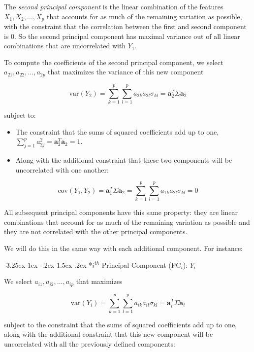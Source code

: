 \documentclass[]{book}
\makeatletter
\renewcommand\subsection{\@startsection{subsection}{2}{\z@}%
                                     {-3.25ex\@plus -1ex \@minus -.2ex}%
                                     {1.5ex \@plus .2ex}%
                                     {\normalfont\large\bfseries\color{Violet}}}
\theoremstyle{definition}
\theoremstyle{definition}
\theoremstyle{definition}
\theoremstyle{remark}
\makeatother
\begin{document}
The \emph{second principal component} is the linear combination of the
features \(X_1,X_2,\ldots,X_p\) that accounts for as much of the
remaining variation as possible, with the constraint that the
correlation between the first and second component is 0. So the second
principal component has maximal variance out of all linear combinations
that are uncorrelated with \(Y_1\).

To compute the coefficients of the second principal component, we select
\(a_{21},a_{22},\ldots,a_{2p}\) that maximizes the variance of this new
component

\[\text{var}(Y_2) = \sum_{k=1}^{p}\sum_{l=1}^{p}a_{2k}a_{2l}\sigma_{kl} = \mathbf{a}^T_2\Sigma\mathbf{a}_2 \]

subject to:

\begin{itemize}
\item
  The constraint that the sums of squared coefficients add up to one,
  \(\sum_{j=1}^{p}a^2_{2j} = \mathbf{a}^T_2\mathbf{a}_2 = 1\).
\item
  Along with the additional constraint that these two components will be
  uncorrelated with one another:
\end{itemize}

\[ \text{cov}(Y_1, Y_2) = \mathbf{a}^T_1\Sigma\mathbf{a}_2  = \sum_{k=1}^{p}\sum_{l=1}^{p}a_{1k}a_{2l}\sigma_{kl} = 0 \]

All subsequent principal components have this same property: they are
linear combinations that account for as much of the remaining variation
as possible and they are not correlated with the other principal
components.

We will do this in the same way with each additional component. For
instance:

\subsection*{\texorpdfstring{\(i^{th}\) Principal Component
(\(\text{PC}_i\)):
\(Y_i\)}{i\^{}\{th\} Principal Component (\textbackslash{}text\{PC\}\_i): Y\_i}}\label{ith-principal-component-textpc_i-y_i}

We select \(a_{i1},a_{i2},\ldots,a_{ip}\) that maximizes

\[ \text{var}(Y_i) = \sum_{k=1}^{p}\sum_{l=1}^{p}a_{ik}a_{il}\sigma_{kl} = \mathbf{a}^T_i\Sigma\mathbf{a}_i \]

subject to the constraint that the sums of squared coefficients add up
to one, along with the additional constraint that this new component
will be uncorrelated with all the previously defined components:
\end{document}
